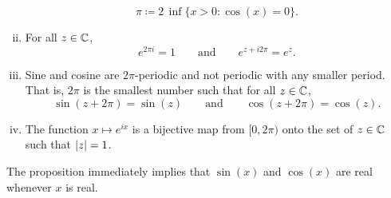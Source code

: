 \begin{prop}
\begin{enumerate}[(i)]
\begin{equation*}
\pi \coloneqq 2 \, \inf \{ x > 0 : \cos(x) = 0 \} .
\end{equation*}
\item
For all $z \in {\mathbb{C}}$, 
\begin{equation*}
e^{2\pi i} = 1 \qquad \text{and} \qquad e^{z + i 2\pi} = e^z.
\end{equation*}
\item
Sine and cosine are $2\pi$-periodic and not periodic with any smaller
period.  That is, $2\pi$ is the smallest number such that for all $z \in {\mathbb{C}}$,
\begin{equation*}
\sin(z+2\pi) = \sin(z)
\qquad \text{and} \qquad
\cos(z+2\pi) = \cos(z) .
\end{equation*}
\item
The function $x \mapsto e^{ix}$ is a bijective map from $[0,2\pi)$
onto the set of $z \in {\mathbb{C}}$ such that $\lvert {z} \rvert = 1$.
\end{enumerate}
\end{prop}

The proposition immediately implies that $\sin(x)$ and $\cos(x)$ are 
real whenever $x$ is real.


